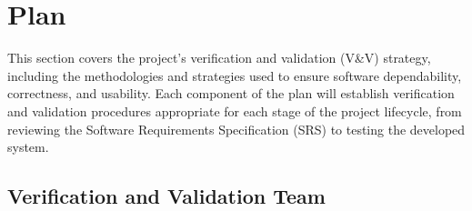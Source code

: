 \documentclass[12pt, titlepage]{article}
\begin{document}
\section{Plan}


\noindent This section covers the project's verification and validation (V\&V) strategy, including the methodologies and strategies used to ensure software dependability, correctness, and usability. Each component of the plan will establish verification and validation procedures appropriate for each stage of the project lifecycle, from reviewing the Software Requirements Specification (SRS) to testing the developed system.

\subsection{Verification and Validation Team}
\end{document}

